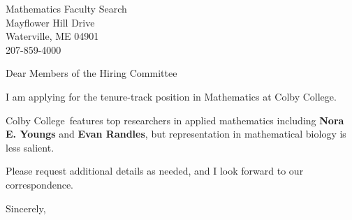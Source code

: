 




	
	
	\def\School{Colby College}
	
	\begin{letter}
		{Mathematics Faculty Search\\
			Mayflower Hill Drive\\
			Waterville, ME 04901\\
			207-859-4000
		}
		
		\opening{Dear Members of the Hiring Committee}
		
		
		I am applying for the tenure-track position in Mathematics at \School. 
		
		
		
		\School~features top researchers in applied mathematics including \textbf{Nora E. Youngs} and \textbf{Evan Randles}, but representation in mathematical biology is less salient. 
		
		
		
		
		
		Please request additional details as needed, and I look forward to our correspondence.
		
		\closing{Sincerely,}
	\end{letter}
